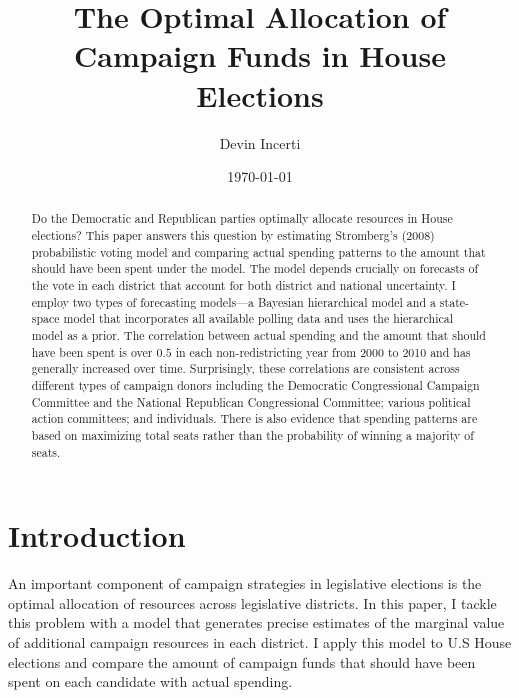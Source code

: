 \documentclass[12pt,final,fleqn]{article}
\theoremstyle{plain}
\begin{document}
\author{Devin Incerti}
\title{\textbf{The Optimal Allocation of Campaign Funds in House Elections}}
\date{\today}
\maketitle

\thispagestyle{empty}
\setcounter{page}{0}

\begin{singlespacing}
\begin{abstract}
Do the Democratic and Republican parties optimally allocate resources in House elections? This paper answers this question by estimating Stromberg's (2008) probabilistic voting model and comparing actual spending patterns to the amount that should have been spent under the model. The model depends crucially on forecasts of the vote in each district that account for both district and national uncertainty. I employ two types of forecasting models---a Bayesian hierarchical model and a state-space model that incorporates all available polling data and uses the hierarchical model as a prior. The correlation between actual spending and the amount that should have been spent is over $0.5$ in each non-redistricting year from 2000 to 2010 and has generally increased over time.  Surprisingly, these correlations are consistent across different types
of campaign donors including the Democratic Congressional Campaign Committee and the National Republican Congressional Committee; various political action committees; and individuals. There is also evidence that spending patterns are based on maximizing total seats rather than the probability of winning a majority of seats.
\end{abstract}
\end{singlespacing}

\clearpage
\doublespacing

\section{Introduction}
An important component of campaign strategies in legislative elections is the optimal allocation of resources across legislative districts. In this paper, I tackle this problem with a  model that generates precise estimates of the marginal value of additional campaign resources in each district. I apply this model to U.S House elections and compare the amount of campaign funds that should have been spent on each candidate with actual spending. 
\end{document}
